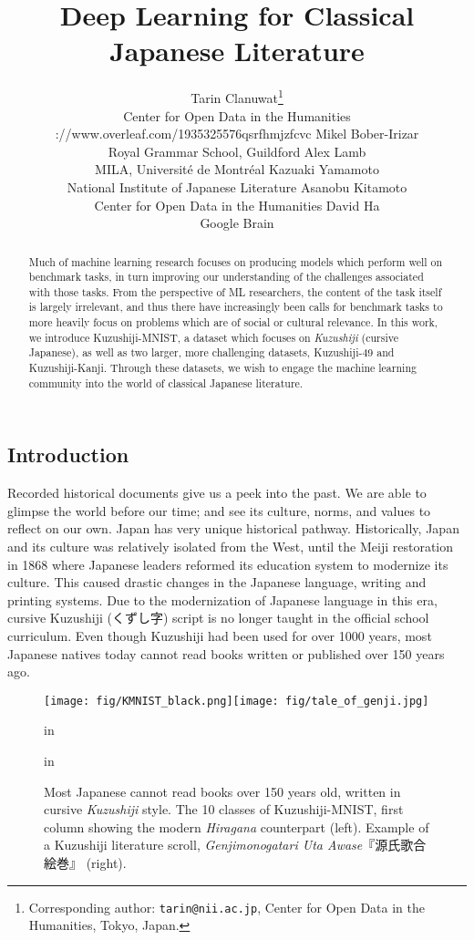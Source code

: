 \documentclass{article}
\title{Deep Learning for Classical Japanese Literature}
\author{
  Tarin Clanuwat\thanks{Corresponding author: \texttt{tarin@nii.ac.jp}, Center for Open Data in the Humanities, Tokyo, Japan.} \\
  Center for Open Data in the Humanities
  \Andhttps://www.overleaf.com/1935325576qsrfhmjzfcvc
  Mikel Bober-Irizar \\
  Royal Grammar School, Guildford
  \AND
  Alex Lamb\\
  MILA, Université de Montréal
  \And
  Kazuaki Yamamoto\\
  National Institute of Japanese Literature
  \AND
  Asanobu Kitamoto \\
  Center for Open Data in the Humanities
  \And
  David Ha \\
  Google Brain
}
\begin{document}
\begin{CJK}{UTF8}{min}

\maketitle

\begin{abstract}

Much of machine learning research focuses on producing models which perform well on benchmark tasks, in turn improving our understanding of the challenges associated with those tasks. From the perspective of ML researchers, the content of the task itself is largely irrelevant, and thus there have increasingly been calls for benchmark tasks to more heavily focus on problems which are of social or cultural relevance. In this work, we introduce Kuzushiji-MNIST, a dataset which focuses on \textit{Kuzushiji} (cursive Japanese), as well as two larger, more challenging datasets, Kuzushiji-49 and Kuzushiji-Kanji. Through these datasets, we wish to engage the machine learning community into the world of classical Japanese literature.

\end{abstract}

\section{Introduction}

Recorded historical documents give us a peek into the past. We are able to glimpse the world before our time; and see its culture, norms, and values to reflect on our own. Japan has very unique historical pathway. Historically, Japan and its culture was relatively isolated from the West, until the Meiji restoration in 1868 where Japanese leaders reformed its education system to modernize its culture. This caused drastic changes in the Japanese language, writing and printing systems. Due to the modernization of Japanese language in this era, cursive Kuzushiji (くずし字) script is no longer taught in the official school curriculum. Even though Kuzushiji had been used for over 1000 years, most Japanese natives today cannot read books written or published over 150 years ago.
\cite{meiji_education,hashimoto2017kuzushiji}

\begin{figure}[!htb]
\vskip -0.05in
\begin{center}
\centerline{\texttt{[image: fig/KMNIST\_black.png]}\hspace{1mm}\texttt{[image: fig/tale\_of\_genji.jpg]}}
 in
\caption{Most Japanese cannot read books over 150 years old, written in cursive \textit{Kuzushiji} style. The 10 classes of Kuzushiji-MNIST, first column showing the modern \textit{Hiragana} counterpart (left). Example of a Kuzushiji literature scroll, \textit{Genjimonogatari Uta Awase}『源氏歌合絵巻』\cite{genji_scroll} (right).}
\label{fig:kuzushiji10}
\end{center}
 in
\end{figure}


\end{CJK}
\end{document}
